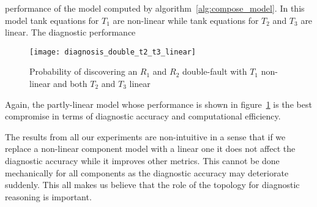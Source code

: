 performance of the model computed by
algorithm~\ref{alg:compose_model}. In this model tank equations for
$T_1$ are non-linear while tank equations for $T_2$ and $T_3$ are
linear. The diagnostic performance 
%
\begin{figure}[htb]
  \centering
  \texttt{[image: diagnosis\_double\_t2\_t3\_linear]}
  \caption{Probability of discovering an $R_1$ and $R_2$ double-fault with $T_1$ non-linear and both $T_2$ and $T_3$ linear}
  \label{fig:diagnosis_double_t2_t3_linear}
\end{figure}
\par
%
Again, the partly-linear model whose performance is shown in
figure~\ref{fig:diagnosis_double_t2_t3_linear} is the best
compromise in terms of diagnostic accuracy and computational
efficiency.
\par
The results from all our experiments are non-intuitive in a sense that
if we replace a non-linear component model with a linear one it does
not affect the diagnostic accuracy while it improves other
metrics. This cannot be done mechanically for all components as the
diagnostic accuracy may deteriorate suddenly. This all makes us believe
that the role of the topology for diagnostic reasoning is important.
